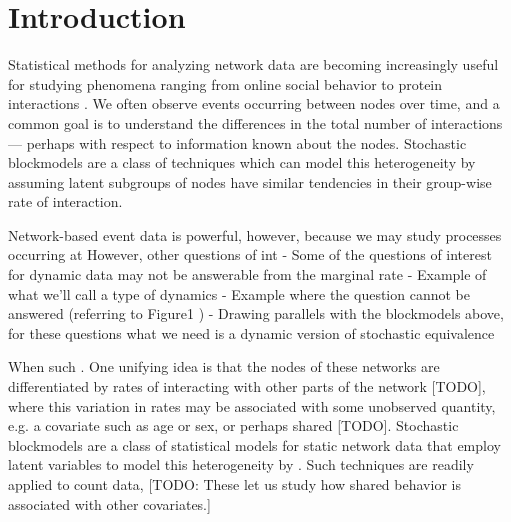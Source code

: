 \section{Introduction}

Statistical methods for analyzing network data are becoming increasingly useful for studying phenomena ranging from online social behavior to protein  interactions \cite{Goldenberg2009}.
We often  observe events occurring between nodes over time, and a common goal is to understand the differences in the total number of interactions --- perhaps with respect to information known about the nodes.
Stochastic blockmodels \cite{} are a class of techniques which can model this heterogeneity by assuming latent subgroups of nodes have similar tendencies in their group-wise rate of interaction.

Network-based event data is powerful, however, because we may study processes occurring at 
However, other questions of int
- Some of the questions of interest for dynamic data may not be answerable from the marginal rate
- Example of what we'll call a type of dynamics
- Example where the question cannot be answered (referring to Figure1 )
- Drawing parallels with the blockmodels above, for these questions what we need is a dynamic version of stochastic equivalence

When such .  One unifying idea is that the nodes of these networks are differentiated by rates of interacting with other parts of the network [TODO], where this variation in rates may be associated with some unobserved quantity, e.g. a covariate such as age or sex, or perhaps shared [TODO].
Stochastic blockmodels \cite{Nowicki2001, Kemp, Ishiguro2010, Rodriguez} are a class of statistical models for static network data that employ latent variables to model this heterogeneity by .  Such techniques are readily applied to count data, [TODO: These let us study how shared behavior is associated with other covariates.]



